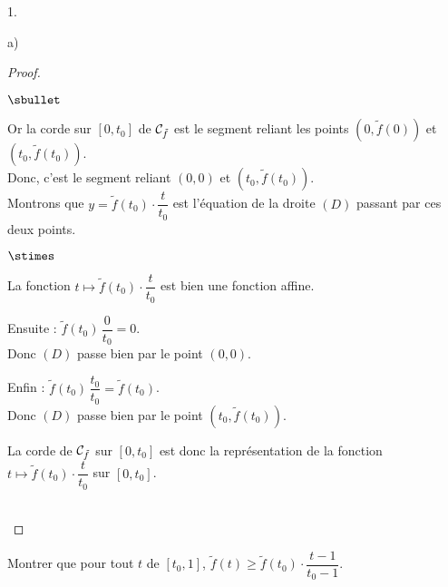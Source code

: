 \documentclass[11pt]{article}%
\begin{document}
\begin{noliste}{1.}
\begin{noliste}{a)}
\begin{proof}
\begin{noliste}{$\sbullet$}
      \item Or la corde sur $[0,t_0]$ de ${\cal C}_{\tilde{f}}$ est le 
      segment 
      reliant les points $(0,\tilde{f}(0))$ et $(t_0,\tilde{f}(t_0))$.\\
      Donc, c'est le segment reliant 
      $(0,0)$ et $(t_0, \tilde{f}(t_0))$.\\
      Montrons que $y= \tilde{f}(t_0) \cdot \dfrac{t}{t_0}$ est 
      l'équation 
      de la droite $(D)$ passant par ces deux points.
      \begin{noliste}{$\stimes$}
        \item La fonction $t\mapsto \tilde{f}(t_0) \cdot 
	\dfrac{t}{t_0}$ est 
        bien une fonction affine.
        \item Ensuite : $\tilde{f}(t_0) \, \dfrac{0}{t_0} = 0$. \\[.1cm]
        Donc $(D)$ passe bien 
        par le point $(0,0)$.
        \item Enfin : $\tilde{f}(t_0) \, \dfrac{t_0}{t_0} = 
	\tilde{f}(t_0)$. \\[.1cm]
        Donc $(D)$ 
        passe bien par le point $(t_0,\tilde{f}(t_0))$.
      \end{noliste}


      La corde de ${\cal C}_{\tilde{f}}$ sur $[0,t_0]$ est donc la 
      représentation 
      de la 
      fonction $t\mapsto \tilde{f}(t_0)\cdot \dfrac{t}{t_0}$
      sur $[0,t_0]$.
    \end{noliste}
    
    
    
    
    
    
    
    ~\\[-1.4cm]
  \end{proof}

  
  \item Montrer que pour tout $t$ de $[t_0,1]$, $\tilde{f}(t) \geq 
  \tilde{f}(t_0) \cdot \dfrac{t-1}{t_0-1}$. 
  

\end{noliste}
\end{noliste}
\end{document}
